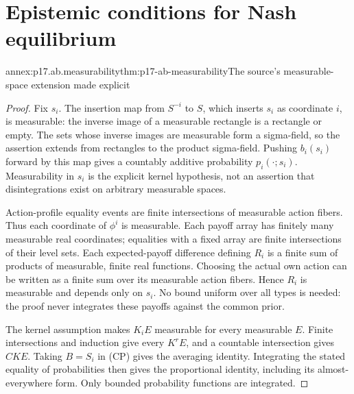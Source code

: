 \section{Epistemic conditions for Nash equilibrium}
\label{sec:annex-p17-epistemic-nash-conditions}

\begin{annexitem}{annex:p17.ab.measurability}{thm:p17-ab-measurability}{The source's measurable-space extension made explicit}
\begin{proof}
Fix \(s_i\). The insertion map from \(S^{-i}\) to \(S\), which
inserts \(s_i\) as coordinate \(i\), is measurable: the inverse
image of a measurable rectangle is a rectangle or empty.
The sets whose inverse images are measurable form a sigma-field,
so the assertion extends from rectangles to the product sigma-field.
Pushing \(b_i(s_i)\) forward by this map gives a countably additive
probability \(p_i(\cdot;s_i)\). Measurability in \(s_i\) is the
explicit kernel hypothesis, not an assertion that disintegrations
exist on arbitrary measurable spaces.

Action-profile equality events are finite intersections of measurable
action fibers. Thus each coordinate of \(\phi^i\) is measurable.
Each payoff array has finitely many measurable real coordinates;
equalities with a fixed array are finite intersections of their
level sets. Each expected-payoff difference defining \(R_i\) is
a finite sum of products of measurable, finite real functions.
Choosing the actual own action can be written as a finite sum over
its measurable action fibers. Hence \(R_i\) is measurable and depends
only on \(s_i\). No bound uniform over all types is needed: the
proof never integrates these payoffs against the common prior.

The kernel assumption makes \(K_iE\) measurable for every measurable
\(E\). Finite intersections and induction give every \(K^rE\),
and a countable intersection gives \(CKE\).
Taking \(B=S_i\) in (CP) gives the averaging identity. Integrating
the stated equality of probabilities then gives the proportional
identity, including its almost-everywhere form. Only bounded
probability functions are integrated.
\end{proof}
\end{annexitem}

